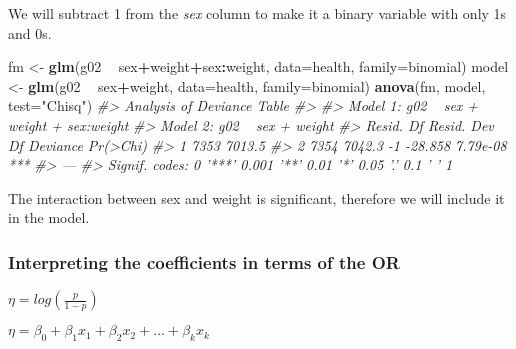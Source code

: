 \documentclass[]{article}
\newenvironment{Shaded}{\begin{snugshade}}{\end{snugshade}}
\newcommand{\CommentTok}[1]{\textcolor[rgb]{0.56,0.35,0.01}{\textit{#1}}}
\newcommand{\DataTypeTok}[1]{\textcolor[rgb]{0.13,0.29,0.53}{#1}}
\newcommand{\DecValTok}[1]{\textcolor[rgb]{0.00,0.00,0.81}{#1}}
\newcommand{\KeywordTok}[1]{\textcolor[rgb]{0.13,0.29,0.53}{\textbf{#1}}}
\newcommand{\NormalTok}[1]{#1}
\newcommand{\OperatorTok}[1]{\textcolor[rgb]{0.81,0.36,0.00}{\textbf{#1}}}
\newcommand{\StringTok}[1]{\textcolor[rgb]{0.31,0.60,0.02}{#1}}
\begin{document}
We will subtract 1 from the \emph{sex} column to make it a binary
variable with only 1s and 0s.

\begin{Shaded}
\end{Shaded}

\begin{Shaded}
\begin{Highlighting}[]
\NormalTok{fm <-}\StringTok{ }\KeywordTok{glm}\NormalTok{(g02 }\OperatorTok{~}\StringTok{ }\NormalTok{sex}\OperatorTok{+}\NormalTok{weight}\OperatorTok{+}\NormalTok{sex}\OperatorTok{:}\NormalTok{weight, }\DataTypeTok{data=}\NormalTok{health, }\DataTypeTok{family=}\NormalTok{binomial)}
\NormalTok{model <-}\StringTok{ }\KeywordTok{glm}\NormalTok{(g02 }\OperatorTok{~}\StringTok{ }\NormalTok{sex}\OperatorTok{+}\NormalTok{weight, }\DataTypeTok{data=}\NormalTok{health, }\DataTypeTok{family=}\NormalTok{binomial)}
\KeywordTok{anova}\NormalTok{(fm, model, }\DataTypeTok{test=}\StringTok{"Chisq"}\NormalTok{)}
\CommentTok{#> Analysis of Deviance Table}
\CommentTok{#> }
\CommentTok{#> Model 1: g02 ~ sex + weight + sex:weight}
\CommentTok{#> Model 2: g02 ~ sex + weight}
\CommentTok{#>   Resid. Df Resid. Dev Df Deviance Pr(>Chi)    }
\CommentTok{#> 1      7353     7013.5                         }
\CommentTok{#> 2      7354     7042.3 -1  -28.858 7.79e-08 ***}
\CommentTok{#> ---}
\CommentTok{#> Signif. codes:  0 '***' 0.001 '**' 0.01 '*' 0.05 '.' 0.1 ' ' 1}
\end{Highlighting}
\end{Shaded}

The interaction between sex and weight is significant, therefore we will
include it in the model.

\newpage

\hypertarget{interpreting-the-coefficients-in-terms-of-the-or}{%
\subsubsection{Interpreting the coefficients in terms of the
OR}\label{interpreting-the-coefficients-in-terms-of-the-or}}

\(\eta = log(\frac{p}{1-p})\)

\(\eta = \beta_0 + \beta_1 x_1 + \beta_2 x_2 + \dots + \beta_k x_k\)
\end{document}
